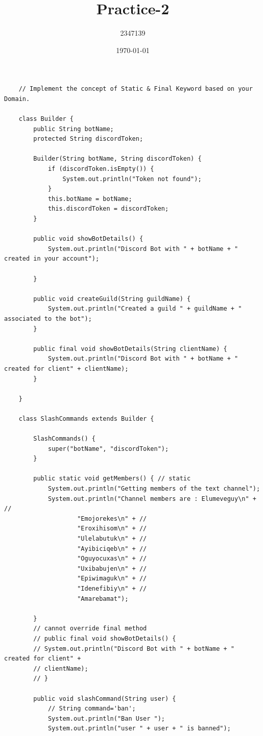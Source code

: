 \documentclass{article}
\title{Practice-2}
\author{2347139}
\date{\today}
\begin{document}
\maketitle
\begin{lstlisting}
    // Implement the concept of Static & Final Keyword based on your Domain.

    class Builder {
        public String botName;
        protected String discordToken;
    
        Builder(String botName, String discordToken) {
            if (discordToken.isEmpty()) {
                System.out.println("Token not found");
            }
            this.botName = botName;
            this.discordToken = discordToken;
        }
    
        public void showBotDetails() {
            System.out.println("Discord Bot with " + botName + " created in your account");
    
        }
    
        public void createGuild(String guildName) {
            System.out.println("Created a guild " + guildName + " associated to the bot");
        }
    
        public final void showBotDetails(String clientName) {
            System.out.println("Discord Bot with " + botName + " created for client" + clientName);
        }
    
    }
    
    class SlashCommands extends Builder {
    
        SlashCommands() {
            super("botName", "discordToken");
        }
    
        public static void getMembers() { // static
            System.out.println("Getting members of the text channel");
            System.out.println("Channel members are : Elumeveguy\n" + //
                    "Emojorekes\n" + //
                    "Eroxihisom\n" + //
                    "Ulelabutuk\n" + //
                    "Ayibiciqeb\n" + //
                    "Oguyocuxas\n" + //
                    "Uxibabujen\n" + //
                    "Epiwimaguk\n" + //
                    "Idenefibiy\n" + //
                    "Amarebamat");
    
        }
        // cannot override final method
        // public final void showBotDetails() {
        // System.out.println("Discord Bot with " + botName + " created for client" +
        // clientName);
        // }
    
        public void slashCommand(String user) {
            // String command='ban';
            System.out.println("Ban User ");
            System.out.println("user " + user + " is banned");
    

\end{lstlisting}
\end{document}
